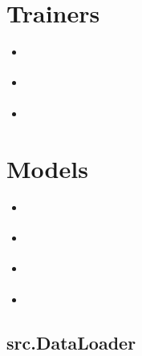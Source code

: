 \documentclass[letterpaper,10pt,english]{sphinxmanual}
\begin{document}
\section{Trainers}
\label{\detokenize{index:trainers}}\begin{itemize}
\item {} 
\sphinxAtStartPar
{\hyperref[\detokenize{autoapi/src/DataLoader/index::doc}]{}}

\item {} 
\sphinxAtStartPar
{\hyperref[\detokenize{autoapi/src/Interface/index::doc}]{}}

\item {} 
\sphinxAtStartPar
{\hyperref[\detokenize{autoapi/src/Utils/index::doc}]{}}

\end{itemize}


\section{Models}
\label{\detokenize{index:id1}}\begin{itemize}
\item {} 
\sphinxAtStartPar
{\hyperref[\detokenize{autoapi/src/LSTMTrainer/index::doc}]{}}

\item {} 
\sphinxAtStartPar
{\hyperref[\detokenize{autoapi/src/CNNTrainer/index::doc}]{}}

\item {} 
\sphinxAtStartPar
{\hyperref[\detokenize{autoapi/src/RNNTrainer/index::doc}]{}}

\item {} 
\sphinxAtStartPar
{\hyperref[\detokenize{autoapi/src/RandomForestTrainer/index::doc}]{}}

\end{itemize}

\sphinxstepscope


\subsection{src.DataLoader}
\label{\detokenize{autoapi/src/DataLoader/index:module-src.DataLoader}}\label{\detokenize{autoapi/src/DataLoader/index:src-dataloader}}\label{\detokenize{autoapi/src/DataLoader/index::doc}}
\end{document}
